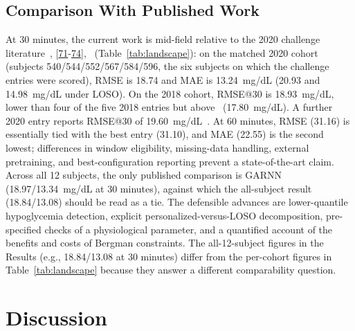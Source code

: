 \documentclass[journal]{IEEEtran}
\begin{document}
\subsection{Comparison With Published Work}

At 30 minutes, the current work is mid-field relative to the 2020 challenge literature~\cite{ref64}, [\hyperref[ref60label]{71}-\hyperref[ref63label]{74}],~\cite{ref65} (Table~\ref{tab:landscape}): on the matched 2020 cohort (subjects 540/544/552/567/584/596, the six subjects on which the challenge entries were scored), RMSE is 18.74 and MAE is 13.24~mg/dL (20.93 and 14.98~mg/dL under LOSO). On the 2018 cohort, RMSE@30 is 18.93~mg/dL, lower than four of the five 2018 entries but above~\cite{ref59} (17.80~mg/dL). A further 2020 entry reports RMSE@30 of 19.60~mg/dL~\cite{ref70}. At 60 minutes, RMSE (31.16) is essentially tied with the best entry (31.10), and MAE (22.55) is the second lowest; differences in window eligibility, missing-data handling, external pretraining, and best-configuration reporting prevent a state-of-the-art claim. Across all 12 subjects, the only published comparison is GARNN~\cite{ref75} (18.97/13.34~mg/dL at 30 minutes), against which the all-subject result (18.84/13.08) should be read as a tie. The defensible advances are lower-quantile hypoglycemia detection, explicit personalized-versus-LOSO decomposition, pre-specified checks of a physiological parameter, and a quantified account of the benefits and costs of Bergman constraints. The all-12-subject figures in the Results (e.g., 18.84/13.08 at 30 minutes) differ from the per-cohort figures in Table~\ref{tab:landscape} because they answer a different comparability question.






\section{Discussion}
\end{document}
